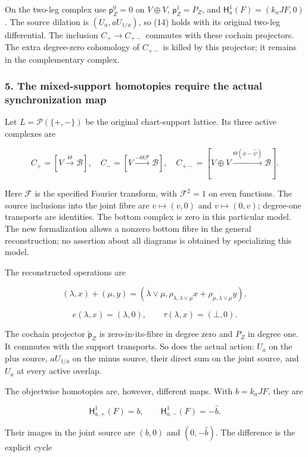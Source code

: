 On the two-leg complex use \(\mathsf p_Z^0=0\) on \(V\oplus V\), \(\mathsf p_Z^1=P_Z\), and
\(\mathsf H_a^1(F)=(k_aJF,0)\). The source dilation is \((U_a,aU_{1/a})\), so (14) holds with its
original two-leg differential. The inclusion \(C_+\to C_{+-}\) commutes with these cochain
projectors. The extra degree-zero cohomology of \(C_{+-}\) is killed by this projector; it remains
in the complementary complex.

\subsubsection{5. The mixed-support homotopies require the actual synchronization
map}\label{pr_9:the-mixed-support-homotopies-require-the-actual-synchronization-map}

Let \(L=\mathcal P(\{+,-\})\) be the original chart-support lattice. Its three active complexes are

\[C_+=[V\xrightarrow{\Theta}\mathscr B],\quad
C_-=[V\xrightarrow{-\Theta\mathcal F}\mathscr B],\quad
C_{+-}=[V\oplus V\xrightarrow{\Theta(\phi-\widehat\psi)}\mathscr B].\]

Here \(\mathcal F\) is the specified Fourier transform, with \(\mathcal F^2=1\) on even functions.
The source inclusions into the joint fibre are \(v\mapsto(v,0)\) and \(v\mapsto(0,v)\); degree-one
transports are identities. The bottom complex is zero in this particular model. The new
formalization allows a nonzero bottom fibre in the general reconstruction; no assertion about all
diagrams is obtained by specializing this model.

The reconstructed operations are

\[(\lambda,x)+(\mu,y)=
(\lambda\vee\mu,\rho_{\lambda,\lambda\vee\mu}x+\rho_{\mu,\lambda\vee\mu}y),\]

\[e(\lambda,x)=(\lambda,0),\qquad
\tau(\lambda,x)=(\bot,0).\tag{17}\]

The cochain projector \(\widetilde{\mathsf p}_Z\) is zero-in-its-fibre in degree zero and \(P_Z\) in
degree one. It commutes with the support transports. So does the actual action: \(U_a\) on the plus
source, \(aU_{1/a}\) on the minus source, their direct sum on the joint source, and \(U_a\) at every
active overlap.

The objectwise homotopies are, however, different maps. With \(b=k_aJF\), they are

\[\mathsf H_{a,+}^1(F)=b,\qquad
\mathsf H_{a,-}^1(F)=-\widehat b.\]

Their images in the joint source are \((b,0)\) and \((0,-\widehat b)\). The difference is the
explicit cycle

